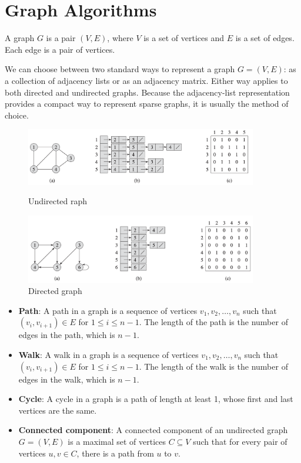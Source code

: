 \chapter{Graph Algorithms}

\begin{definitionblock}[Graph]
A graph $G$ is a pair $(V, E)$, where $V$ is a set of vertices and $E$ is a set of edges. Each edge is a pair of vertices.
\end{definitionblock}

We can choose between two standard ways to represent a graph $G = (V,E)$:
as a collection of adjacency lists or as an adjacency matrix. Either way applies
to both directed and undirected graphs. Because the adjacency-list representation
provides a compact way to represent sparse graphs, it is usually the method of choice.

\begin{figure}[H]
    \centering
    \includegraphics[width=0.9\textwidth]{assets/undirected_graph.png}
    \caption{Undirected raph}
    \label{fig:undirected_graph}

    \vspace{1em}

    \includegraphics[width=0.9\textwidth]{assets/directed_graph.png}
    \caption{Directed graph}
    \label{fig:directed_graph}
\end{figure}

\begin{itemize}
    \item \textbf{Path}: A path in a graph is a sequence of vertices $v_1, v_2, \ldots, v_n$ such that $(v_i, v_{i+1}) \in E$ for $1 \leq i \leq n - 1$. The length of the path is the number of edges in the path, which is $n - 1$.
    \item \textbf{Walk}: A walk in a graph is a sequence of vertices $v_1, v_2, \ldots, v_n$ such that $(v_i, v_{i+1}) \in E$ for $1 \leq i \leq n - 1$. The length of the walk is the number of edges in the walk, which is $n - 1$.
    \item \textbf{Cycle}: A cycle in a graph is a path of length at least 1, whose first and last vertices are the same.
    \item \textbf{Connected component}: A connected component of an undirected graph $G = (V, E)$ is a maximal set of vertices $C \subseteq V$ such that for every pair of vertices $u, v \in C$, there is a path from $u$ to $v$.
\end{itemize}

